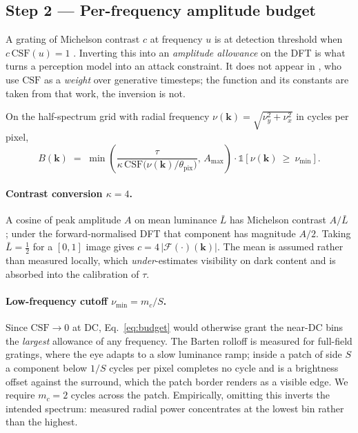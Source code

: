 \subsection{Step 2 — Per-frequency amplitude budget \hfill{\normalfont[novel]}}

A grating of Michelson contrast $c$ at frequency $u$ is at detection
threshold when $c\,\mathrm{CSF}(u)=1$ \citep{barten2003}. Inverting this
into an \emph{amplitude allowance} on the DFT is what turns a perception
model into an attack constraint. It does not appear in
\citet{galinska2026csflow}, who use $\mathrm{CSF}$ as a \emph{weight}
over generative timesteps; the function and its constants are taken from
that work, the inversion is not.

On the half-spectrum grid with radial frequency
$\nu(\mathbf{k})=\sqrt{\nu_y^2+\nu_x^2}$ in cycles per pixel,
\begin{equation}
  B(\mathbf{k}) \;=\;
  \min\!\left(\frac{\tau}{\kappa\,\mathrm{CSF}\!\big(\nu(\mathbf{k})/\theta_{\mathrm{pix}}\big)},\,A_{\max}\right)
  \cdot\mathbb{1}\!\left[\nu(\mathbf{k})\ \ge\ \nu_{\min}\right].
  \label{eq:budget}
\end{equation}

\paragraph{Contrast conversion $\kappa=4$.}
A cosine of peak amplitude $A$ on mean luminance $\bar{L}$ has Michelson
contrast $A/\bar{L}$ \citep{michelson1927}; under the forward-normalised
DFT that component has magnitude $A/2$. Taking $\bar{L}=\tfrac12$ for a
$[0,1]$ image gives $c=4\,|\mathcal{F}(\cdot)(\mathbf{k})|$. The mean is
assumed rather than measured locally, which \emph{under}-estimates
visibility on dark content and is absorbed into the calibration of
$\tau$.

\paragraph{Low-frequency cutoff $\nu_{\min}=m_c/S$.}
Since $\mathrm{CSF}\to0$ at DC, Eq.~\eqref{eq:budget} would otherwise
grant the near-DC bins the \emph{largest} allowance of any frequency.
The Barten rolloff is measured for full-field gratings, where the eye
adapts to a slow luminance ramp; inside a patch of side $S$ a component
below $1/S$ cycles per pixel completes no cycle and is a brightness
offset against the surround, which the patch border renders as a visible
edge. We require $m_c=2$ cycles across the patch. Empirically, omitting
this inverts the intended spectrum: measured radial power concentrates
at the lowest bin rather than the highest.

